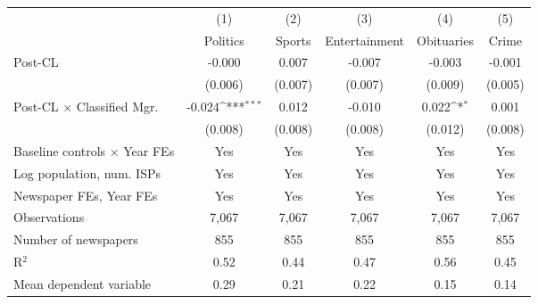 {
\def\sym#1{\ifmmode^{#1}\else\(^{#1}\)\fi}
\begin{tabular}{l*{5}{c}}
\toprule
                    &\multicolumn{1}{c}{(1)}&\multicolumn{1}{c}{(2)}&\multicolumn{1}{c}{(3)}&\multicolumn{1}{c}{(4)}&\multicolumn{1}{c}{(5)}\\
                    &\multicolumn{1}{c}{Politics}&\multicolumn{1}{c}{Sports}&\multicolumn{1}{c}{Entertainment}&\multicolumn{1}{c}{Obituaries}&\multicolumn{1}{c}{Crime}\\
\midrule
Post-CL             &      -0.000         &       0.007         &      -0.007         &      -0.003         &      -0.001         \\
                    &     (0.006)         &     (0.007)         &     (0.007)         &     (0.009)         &     (0.005)         \\
\addlinespace
Post-CL $\times$ Classified Mgr.&      -0.024\sym{***}&       0.012         &      -0.010         &       0.022\sym{*}  &       0.001         \\
                    &     (0.008)         &     (0.008)         &     (0.008)         &     (0.012)         &     (0.008)         \\
\addlinespace
Baseline controls $\times$ Year FEs &         Yes         &         Yes         &         Yes         &         Yes         &         Yes         \\
\addlinespace
Log population, num. ISPs &         Yes         &         Yes         &         Yes         &         Yes         &         Yes         \\
\addlinespace
Newspaper FEs, Year FEs &         Yes         &         Yes         &         Yes         &         Yes         &         Yes         \\
\midrule
Observations        &       7,067         &       7,067         &       7,067         &       7,067         &       7,067         \\
Number of newspapers&         855         &         855         &         855         &         855         &         855         \\
R$^2$               &        0.52         &        0.44         &        0.47         &        0.56         &        0.45         \\
Mean dependent variable&        0.29         &        0.21         &        0.22         &        0.15         &        0.14         \\
\bottomrule
\end{tabular}
}
